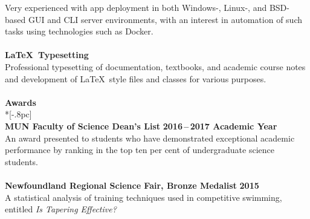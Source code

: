 \documentclass[letterpaper]{article}
\let\dateshape\bf
\begin{document}
Very experienced with app deployment in both Windows-, Linux-, and BSD-based GUI and CLI server environments, with an interest in automation of such tasks using technologies such as Docker. \\
\\
{\bf \LaTeX\ Typesetting} \\
Professional typesetting of documentation, textbooks, and academic course notes and development of \LaTeX\ style files and classes for various purposes. \\
\\[0.5pc] %
{\large \bf Awards} \\*[-.8pc]
\underline{\hspace{\textwidth}} \\[0.5pc]
{\bf MUN Faculty of Science Dean's List} \hfill {\dateshape 2016\,--\,2017 Academic Year} \\
An award presented to students who have demonstrated exceptional academic performance by ranking in the top ten per cent of undergraduate science students. \\
\\
{\bf Newfoundland Regional Science Fair, Bronze Medalist} \hfill {\dateshape 2015\/} \\
A statistical analysis of training techniques used in competitive swimming, 
entitled {\it Is Tapering Effective?} \\
\\[0.5pc] 
\end{document}
